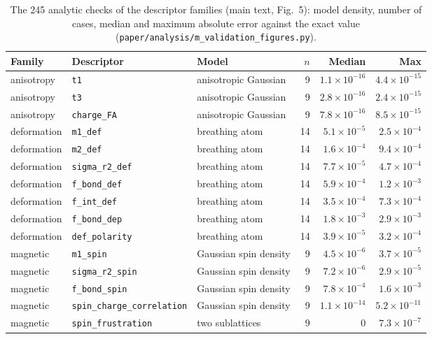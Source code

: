 \begin{table}[htbp]
\centering
\caption{The 245 analytic checks of the descriptor families (main text, Fig.~5): model density, number of cases, median and maximum absolute error against the exact value (\texttt{paper/analysis/m\_validation\_figures.py}).}
\label{tab:si-analytic}
\small
\begin{tabular}{llp{4.2cm}rrr}
\toprule
Family & Descriptor & Model & $n$ & Median & Max \\
\midrule
anisotropy & \texttt{t1} & anisotropic Gaussian & 9 & $1.1\times10^{-16}$ & $4.4\times10^{-15}$ \\
anisotropy & \texttt{t3} & anisotropic Gaussian & 9 & $2.8\times10^{-16}$ & $2.4\times10^{-15}$ \\
anisotropy & \texttt{charge\_FA} & anisotropic Gaussian & 9 & $7.8\times10^{-16}$ & $8.5\times10^{-15}$ \\
deformation & \texttt{m1\_def} & breathing atom & 14 & $5.1\times10^{-5}$ & $2.5\times10^{-4}$ \\
deformation & \texttt{m2\_def} & breathing atom & 14 & $1.6\times10^{-4}$ & $9.4\times10^{-4}$ \\
deformation & \texttt{sigma\_r2\_def} & breathing atom & 14 & $7.7\times10^{-5}$ & $4.7\times10^{-4}$ \\
deformation & \texttt{f\_bond\_def} & breathing atom & 14 & $5.9\times10^{-4}$ & $1.2\times10^{-3}$ \\
deformation & \texttt{f\_int\_def} & breathing atom & 14 & $3.5\times10^{-4}$ & $7.3\times10^{-4}$ \\
deformation & \texttt{f\_bond\_dep} & breathing atom & 14 & $1.8\times10^{-3}$ & $2.9\times10^{-3}$ \\
deformation & \texttt{def\_polarity} & breathing atom & 14 & $3.9\times10^{-5}$ & $3.2\times10^{-4}$ \\
magnetic & \texttt{m1\_spin} & Gaussian spin density & 9 & $4.5\times10^{-6}$ & $3.7\times10^{-5}$ \\
magnetic & \texttt{sigma\_r2\_spin} & Gaussian spin density & 9 & $7.2\times10^{-6}$ & $2.9\times10^{-5}$ \\
magnetic & \texttt{f\_bond\_spin} & Gaussian spin density & 9 & $7.8\times10^{-4}$ & $1.6\times10^{-3}$ \\
magnetic & \texttt{spin\_charge\_correlation} & Gaussian spin density & 9 & $1.1\times10^{-14}$ & $5.2\times10^{-11}$ \\
magnetic & \texttt{spin\_frustration} & two sublattices & 9 & $0$ & $7.3\times10^{-7}$ \\

\end{tabular}
\end{table}

